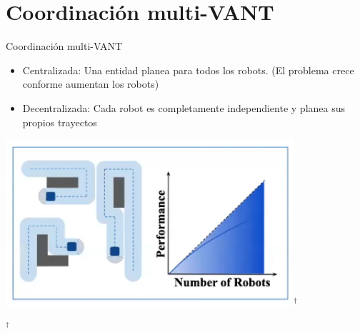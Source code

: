 \documentclass[
  24pt, %
  aspectratio=169, %
]{beamer}
\begin{document}
\section{Coordinación multi-VANT}
\begin{frame}{Coordinación multi-VANT}
  \begin{minipage}{0.47\textwidth}
    \begin{itemize}
    \item Centralizada: Una entidad planea para todos los robots. (El problema crece conforme aumentan los robots)
    \item Decentralizada: Cada robot es completamente independiente y planea sus propios trayectos
    \end{itemize}
  \end{minipage}
  \hspace{0.2cm}
  \begin{minipage}{0.5\textwidth}
    \includegraphics[width=0.8\textwidth]{coordination}$^\dag$\\
      \rule{0in}{1.2em}$^\dag$\scriptsize \cite{amanda}
  \end{minipage}
\end{frame}
\end{document}
